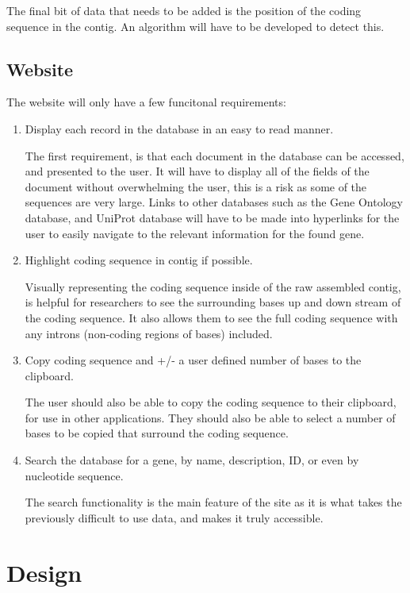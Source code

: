 The final bit of data that needs to be added is the position of the coding sequence in the contig. An algorithm will have to be developed to detect this.

\subsection{Website}
The website will only have a few funcitonal requirements: 

\begin{enumerate}[label=FR\arabic*]
  \item Display each record in the database in an easy to read manner. 

    The first requirement, is that each document in the database can be accessed, and presented to the user. It will have to display all of the fields of the document without overwhelming the user, this is a risk as some of the sequences are very large. Links to other databases such as the Gene Ontology database, and UniProt database will have to be made into hyperlinks for the user to easily navigate to the relevant information for the found gene. 

  \item Highlight coding sequence in contig if possible.

    Visually representing the coding sequence inside of the raw assembled contig, is helpful for researchers to see the surrounding bases up and down stream of the coding sequence. It also allows them to see the full coding sequence with any introns (non-coding regions of bases) included. 

  \item Copy coding sequence and +/- a user defined number of bases to the clipboard.

    The user should also be able to copy the coding sequence to their clipboard, for use in other applications. They should also be able to select a number of bases to be copied that surround the coding sequence. 

  \item Search the database for a gene, by name, description, ID, or even by nucleotide sequence. 

    The search functionality is the main feature of the site as it is what takes the previously difficult to use data, and makes it truly accessible. 
\end{enumerate}

\section{Design}

